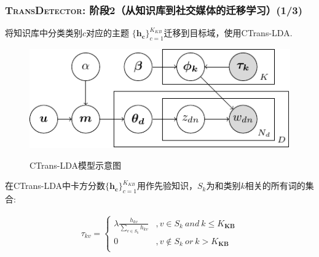 \begin{frame}
\frametitle{\textsc{TransDetector}: 阶段2（从知识库到社交媒体的迁移学习）(1/3)}
将知识库中分类类别$c$对应的主题 \(\{\bm{h_c}\}_{c=1}^{K_{KB}}\)迁移到目标域，使用CTrans-LDA.
\vspace{-3mm}
\begin{figure}[h]
		\setlength{\abovecaptionskip}{0.cm}
        \setlength{\belowcaptionskip}{0.cm}
        \centering
 		\caption{CTrans-LDA模型示意图}
        \includegraphics[width=0.6\columnwidth]{img/lda_tikz.pdf}
        \label{fig:hood}
\end{figure}

在CTrans-LDA中卡方分数\(\{\bm{h_c}\}_{c=1}^{K_{KB}}\)用作先验知识，$S_k$为和类别$k$相关的所有词的集合:
\setlength{\abovedisplayskip}{0pt}
\setlength{\belowdisplayskip}{0pt}
\begin{scriptsize}
\begin{equation}
\label{eq:wikiPrior}
\begin{aligned}
\tau_{kv}=
\left\{ \begin{aligned}
\lambda \frac{h_{kv}}{\sum_{v\in S_{k}}h_{kv}} &,v\in S_{k}\ and  \ k \leq K_{\bm{KB}} \\
0&,v \notin S_{k} \ or \ k > K_{\bm{KB}} \\
\end{aligned}\right.
\end{aligned}
\end{equation}
\end{scriptsize}
\end{frame}

